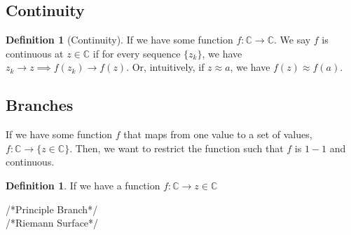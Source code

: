 \documentclass[11pt]{article}
\theoremstyle{definition}
\newtheorem{definition}[theorem]{Definition}
\begin{document}
\subsection{Continuity}
\begin{definition}[Continuity]
    If we have some function $f: \mathbb{C} \to \mathbb{C}$. We say $f$ is
    continuous at $z \in \mathbb{C}$ if for every sequence $\{ z_k \}$, we
    have $z_k \to z \implies f(z_k) \to f(z)$. Or, intuitively, if $z
    \approx a$, we have $f(z) \approx f(a)$.
\end{definition}

\subsection{Branches}
If we have some function $f$ that maps from one value to a set of values,
$f: \mathbb{C} \to \{z \in \mathbb{C}\}$. Then, we want to restrict the
function such that $f$ is $1-1$ and continuous.
\begin{definition}
    If we have a function $f: \mathbb{C} \to {z \in \mathbb{C}}$
\end{definition}
/*Principle Branch*/\\
/*Riemann Surface*/
\end{document}
